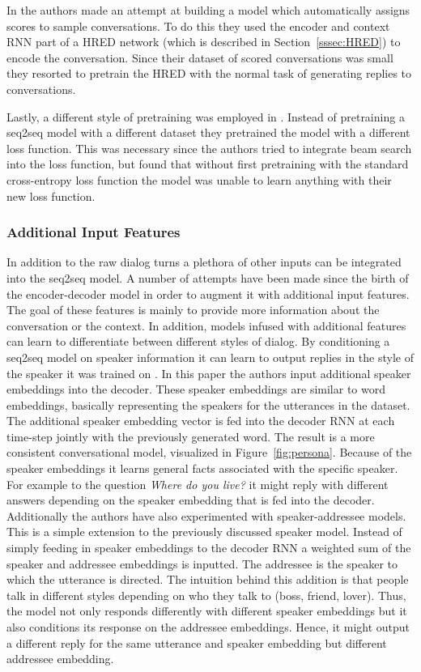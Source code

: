 \documentclass[12pt]{article}
\begin{document}
In \cite{Lowe:2017} the authors made an attempt at building a model which automatically assigns scores to sample conversations. To do this they used the encoder and context RNN part of a HRED network (which is described in Section~\ref{sssec:HRED}) to encode the conversation. Since their dataset of scored conversations was small they resorted to pretrain the HRED with the normal task of generating replies to conversations.

Lastly, a different style of pretraining was employed in \cite{Wiseman:2016}. Instead of pretraining a seq2seq model with a different dataset they pretrained the model with a different loss function. This was necessary since the authors tried to integrate beam search into the loss function, but found that without first pretraining with the standard cross-entropy loss function the model was unable to learn anything with their new loss function.

\subsubsection{Additional Input Features} \label{sssec:priors}
In addition to the raw dialog turns a plethora of other inputs can be integrated into the seq2seq model. A number of attempts have been made since the birth of the encoder-decoder model in order to augment it with additional input features. The goal of these features is mainly to provide more information about the conversation or the context. In addition, models infused with additional features can learn to differentiate between different styles of dialog. By conditioning a seq2seq model on speaker information it can learn to output replies in the style of the speaker it was trained on \cite{Li:2016}. In this paper the authors input additional speaker embeddings into the decoder. These speaker embeddings are similar to word embeddings, basically representing the speakers for the utterances in the dataset. The additional speaker embedding vector is fed into the decoder RNN at each time-step jointly with the previously generated word. The result is a more consistent conversational model, visualized in Figure~\ref{fig:persona}. Because of the speaker embeddings it learns general facts associated with the specific speaker. For example to the question \textit{Where do you live?} it might reply with different answers depending on the speaker embedding that is fed into the decoder. Additionally the authors have also experimented with speaker-addressee models. This is a simple extension to the previously discussed speaker model. Instead of simply feeding in speaker embeddings to the decoder RNN a weighted sum of the speaker and addressee embeddings is inputted. The addressee is the speaker to which the utterance is directed. The intuition behind this addition is that people talk in different styles depending on who they talk to (boss, friend, lover). Thus, the model not only responds differently with different speaker embeddings but it also conditions its response on the addressee embeddings. Hence, it might output a different reply for the same utterance and speaker embedding but different addressee embedding.
\end{document}
